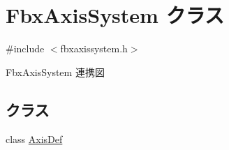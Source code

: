 \hypertarget{class_fbx_axis_system}{}\section{Fbx\+Axis\+System クラス}
\label{class_fbx_axis_system}


{\ttfamily \#include $<$fbxaxissystem.\+h$>$}



Fbx\+Axis\+System 連携図
\subsection*{クラス}
\begin{DoxyCompactItemize}
\item 
class \hyperlink{class_fbx_axis_system_1_1_axis_def}{Axis\+Def}
\end{DoxyCompactItemize}
